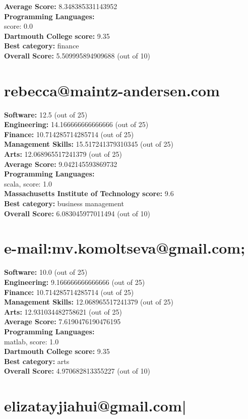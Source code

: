 \documentclass{article}
\begin{document}
\textbf{Average Score: } 8.348385331143952\\
\textbf{Programming Languages:} \\
score: 0.0\\
\textbf{Dartmouth College} \textbf{score:} 9.35\\
\textbf{Best category: } finance\\
\textbf{Overall Score: }5.509995894909688 (out of 10)\section{rebecca@maintz-andersen.com}
\textbf{Software:} 12.5 (out of 25)\\
\textbf{Engineering: } 14.166666666666666 (out of 25)\\
\textbf{Finance:} 10.714285714285714 (out of 25)\\
\textbf{Management Skills:} 15.517241379310345 (out of 25)\\
\textbf{Arts:} 12.068965517241379 (out of 25)\\
\textbf{Average Score: } 9.042145593869732\\
\textbf{Programming Languages:} \\
scala, score: 1.0\\
\textbf{Massachusetts Institute of Technology} \textbf{score:} 9.6\\
\textbf{Best category: } business management\\
\textbf{Overall Score: }6.083045977011494 (out of 10)\section{e-mail:mv.komoltseva@gmail.com;}
\textbf{Software:} 10.0 (out of 25)\\
\textbf{Engineering: } 9.166666666666666 (out of 25)\\
\textbf{Finance:} 10.714285714285714 (out of 25)\\
\textbf{Management Skills:} 12.068965517241379 (out of 25)\\
\textbf{Arts:} 12.931034482758621 (out of 25)\\
\textbf{Average Score: } 7.6190476190476195\\
\textbf{Programming Languages:} \\
matlab, score: 1.0\\
\textbf{Dartmouth College} \textbf{score:} 9.35\\
\textbf{Best category: } arts\\
\textbf{Overall Score: }4.970682813355227 (out of 10)\section{elizatayjiahui@gmail.com|}
\end{document}
